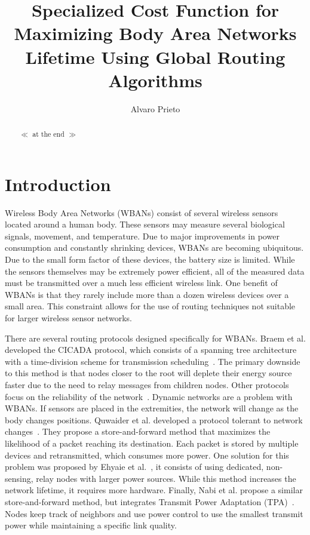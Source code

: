 \documentclass{article}
\begin{document}
\title{Specialized Cost Function for Maximizing Body Area Networks Lifetime Using Global Routing Algorithms}
\author{Alvaro Prieto}
\maketitle

\begin{abstract}
$\ll$ at the end $\gg$
\end{abstract}

\section{Introduction}
Wireless Body Area Networks (WBANs) consist of several wireless sensors located around a human body. These sensors may measure several biological signals, movement, and temperature. Due to major improvements in power consumption and constantly shrinking devices, WBANs are becoming ubiquitous. Due to the small form factor of these devices, the battery size is limited. While the sensors themselves may be extremely power efficient, all of the measured data must be transmitted over a much less efficient wireless link. One benefit of WBANs is that they rarely include more than a dozen wireless devices over a small area. This constraint allows for the use of routing techniques not suitable for larger wireless sensor networks.

There are several routing protocols designed specifically for WBANs. Braem et al. developed the CICADA protocol, which consists of a spanning tree architecture with a time-division scheme for transmission scheduling~\cite{protocol:CICADA}. The primary downside to this method is that nodes closer to the root will deplete their energy source faster due to the need to relay messages from children nodes. Other protocols focus on the reliability of the network~\cite{routing:storeandforward}. Dynamic networks are a problem with WBANs. If sensors are placed in the extremities, the network will change as the body changes positions. Quwaider et al. developed a protocol tolerant to network changes~\cite{routing:storeandforward}. They propose a store-and-forward method that maximizes the likelihood of a packet reaching its destination. Each packet is stored by multiple devices and retransmitted, which consumes more power. One solution for this problem was proposed by Ehyaie et al.~\cite{relay:networklife}, it consists of using dedicated, non-sensing, relay nodes with larger power sources. While this method increases the network lifetime, it requires more hardware. Finally, Nabi et al. propose a similar store-and-forward method, but integrates Transmit Power Adaptation (TPA)~\cite{relay:transmitpoweradaptation}. Nodes keep track of neighbors and use power control to use the smallest transmit power while maintaining a specific link quality.
\end{document}
